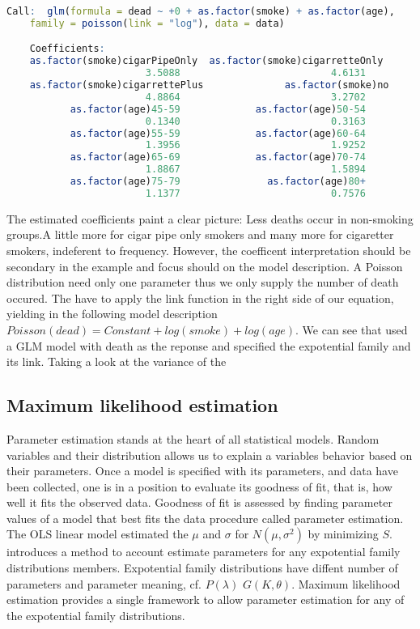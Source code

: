 \documentclass{article}
\begin{document}
    \begin{lstlisting}[language=R]
    Call:  glm(formula = dead ~ +0 + as.factor(smoke) + as.factor(age),
    family = poisson(link = "log"), data = data)

    Coefficients:
    as.factor(smoke)cigarPipeOnly  as.factor(smoke)cigarretteOnly
                        3.5088                          4.6131
    as.factor(smoke)cigarrettePlus              as.factor(smoke)no
                        4.8864                          3.2702
           as.factor(age)45-59             as.factor(age)50-54
                        0.1340                          0.3163
           as.factor(age)55-59             as.factor(age)60-64
                        1.3956                          1.9252
           as.factor(age)65-69             as.factor(age)70-74
                        1.8867                          1.5894
           as.factor(age)75-79               as.factor(age)80+
                        1.1377                          0.7576
    \end{lstlisting}

    The estimated coefficients paint a clear picture: Less deaths occur in non-smoking groups.A little more for cigar pipe only smokers and many more for cigaretter smokers, indeferent to frequency. However, the coefficent interpretation should be secondary in the example and focus should on the model description. A Poisson distribution need only one parameter thus we only supply the number of death occured. The have to apply the link function in the right side of our equation, yielding in the following model description $Poisson(dead) = Constant + log(smoke) + log(age)$. We can see that used a GLM model with death as the reponse and specified the expotential family and its link. Taking a look at the variance of the


    \subsection{Maximum likelihood estimation}
    Parameter estimation stands at the heart of all statistical models. Random variables and their distribution allows us to explain a variables behavior based on their parameters. Once a model is specified with its parameters, and data have been collected, one is in a position to evaluate its goodness of fit, that is, how well it fits the observed data. Goodness of fit is assessed by finding parameter values of a model that best fits the data procedure called parameter estimation. The OLS linear model estimated the $\mu$ and $\sigma$ for $N( \mu ,\sigma^2)$ by minimizing $S$. \cite{Nelder} introduces a method to account estimate parameters for any expotential family distributions members. Expotential family distributions have diffent number of parameters and parameter meaning, cf.  $P(\lambda)$ $G(K,\theta)$. Maximum likelihood estimation provides a single framework to allow parameter estimation for any of the expotential family distributions.
\end{document}
